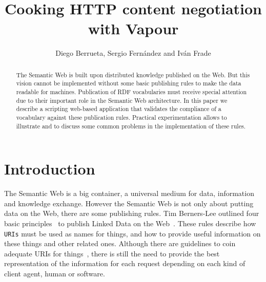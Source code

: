 \documentclass{../templates/llncs}
\begin{document}
\title{Cooking HTTP content negotiation with Vapour} %

\author{Diego Berrueta, Sergio Fern\'andez and Iv\'an Frade}


\maketitle

\begin{abstract}
The Semantic Web is built upon distributed knowledge published on 
the Web. But this vision cannot be implemented without some basic publishing
rules to make the data readable for machines. Publication of RDF vocabularies
must receive special attention due to their important role 
in the Semantic Web architecture. In this paper we describe a scripting 
web-based application that validates the compliance of a vocabulary 
against these publication rules. Practical experimentation allows to 
illustrate and to discuss some common problems in the implementation
of these rules.
\end{abstract}

\section{Introduction}

The Semantic Web is a big container, a universal medium for data, information
and knowledge exchange. However the Semantic Web is not only about putting data on
the Web, there are some publishing rules. Tim Berners-Lee outlined four basic 
principles~\cite{TimBL2006} to publish Linked Data on the Web~\cite{PublishLinkedData2007}.
These rules describe how \texttt{URIs} must be used as names for things, 
and how to provide useful information on these things and other related 
ones. Although there are guidelines to coin adequate URIs for 
things~\cite{Sauermann2007}, there is still the need to provide the best 
representation of the information for each request depending on each kind 
of client agent, human or software.
\end{document}
